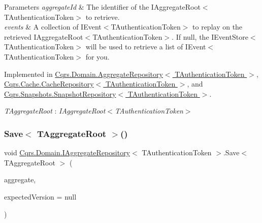 \begin{DoxyParams}{Parameters}
{\em aggregate\+Id} & The identifier of the I\+Aggregate\+Root$<$\+T\+Authentication\+Token$>$ to retrieve.\\
\hline
{\em events} & A collection of I\+Event$<$\+T\+Authentication\+Token$>$ to replay on the retrieved I\+Aggregate\+Root$<$\+T\+Authentication\+Token$>$. If null, the I\+Event\+Store$<$\+T\+Authentication\+Token$>$ will be used to retrieve a list of I\+Event$<$\+T\+Authentication\+Token$>$ for you. \\
\hline
\end{DoxyParams}


Implemented in \hyperlink{classCqrs_1_1Domain_1_1AggregateRepository_a0e55881812d463129df34189d29544b6_a0e55881812d463129df34189d29544b6}{Cqrs.\+Domain.\+Aggregate\+Repository$<$ T\+Authentication\+Token $>$}, \hyperlink{classCqrs_1_1Cache_1_1CacheRepository_a037acba636aedf23ff376ac0b749ec0c_a037acba636aedf23ff376ac0b749ec0c}{Cqrs.\+Cache.\+Cache\+Repository$<$ T\+Authentication\+Token $>$}, and \hyperlink{classCqrs_1_1Snapshots_1_1SnapshotRepository_acdbea47afc87de1da613a6eff3ceef0f_acdbea47afc87de1da613a6eff3ceef0f}{Cqrs.\+Snapshots.\+Snapshot\+Repository$<$ T\+Authentication\+Token $>$}.

\begin{Desc}
\item[Type Constraints]\begin{description}
\item[{\em T\+Aggregate\+Root} : {\em I\+Aggregate\+Root$<$T\+Authentication\+Token$>$}]\end{description}
\end{Desc}
\mbox{\label{interfaceCqrs_1_1Domain_1_1IAggregateRepository_a306baf8aa6faabe893f93e5db5d3517d_a306baf8aa6faabe893f93e5db5d3517d}} 
\subsubsection{\texorpdfstring{Save$<$ T\+Aggregate\+Root $>$()}{Save< TAggregateRoot >()}}
{\footnotesize\ttfamily void \hyperlink{interfaceCqrs_1_1Domain_1_1IAggregateRepository}{Cqrs.\+Domain.\+I\+Aggregate\+Repository}$<$ T\+Authentication\+Token $>$.Save$<$ T\+Aggregate\+Root $>$ (\begin{DoxyParamCaption}\item[{T\+Aggregate\+Root}]{aggregate,  }\item[{int?}]{expected\+Version = {\ttfamily null} }\end{DoxyParamCaption})}



